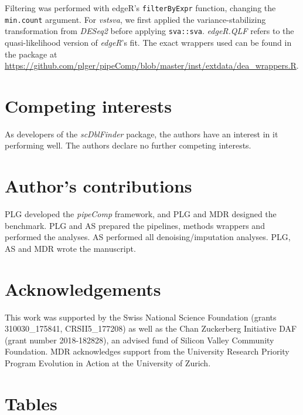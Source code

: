\documentclass[11pt]{article}
\begin{document}
{Filtering was performed with edgeR's \texttt{filterByExpr} function, changing the \texttt{min.count} argument. For \textit{vstsva}, we first applied the variance-stabilizing transformation from \textit{DESeq2}\citep{loveModeratedEstimation2014} before applying \texttt{sva::sva}. \textit{edgeR.QLF} refers to the quasi-likelihood version \citep{lundDetectingDifferential2012} of \textit{edgeR}'s fit. The exact wrappers used can be found in the package at \url{https://github.com/plger/pipeComp/blob/master/inst/extdata/dea\_wrappers.R}.
}


\begin{backmatter}

\section*{Competing interests}
As developers of the \textit{scDblFinder} package, the authors have an interest in it performing well. The authors declare no further competing interests.

\section*{Author's contributions}
PLG developed the \textit{pipeComp} framework, and PLG and MDR designed the benchmark. PLG and AS prepared the pipelines, methods wrappers and performed the analyses. AS performed all denoising/imputation analyses. PLG, AS and MDR wrote the manuscript.

\section*{Acknowledgements}
This work was supported by the Swiss National Science Foundation (grants 310030\_175841, CRSII5\_177208) as well as the Chan Zuckerberg Initiative DAF (grant number 2018-182828), an advised fund of Silicon Valley Community Foundation. MDR acknowledges support from the University Research Priority Program Evolution in Action at the University of Zurich.

\section*{Tables}


\end{backmatter}
\end{document}
